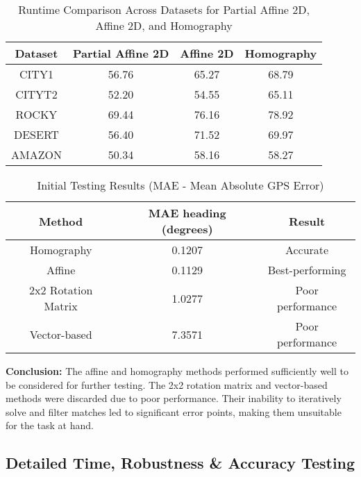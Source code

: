     
    \begin{table}[H]
        \centering
        \caption{Runtime Comparison Across Datasets for Partial Affine 2D, Affine 2D, and Homography}
        \label{tab:runtime_comparison}
        \begin{tabular}{|c|c|c|c|}
        \hline
        \textbf{Dataset} & \textbf{Partial Affine 2D} & \textbf{Affine 2D} & \textbf{Homography} \\
        \hline
        CITY1   & 56.76 & 65.27 & 68.79 \\
        CITYT2  & 52.20 & 54.55 & 65.11 \\
        ROCKY   & 69.44 & 76.16 & 78.92 \\
        DESERT  & 56.40 & 71.52 & 69.97 \\
        AMAZON  & 50.34 & 58.16 & 58.27 \\
        \hline
        \end{tabular}
        \end{table}
        






\begin{table}[H]
    \centering
    \begin{tabular}{|c|c|c|}
        \hline
        \textbf{Method} & \textbf{MAE heading (degrees)} & \textbf{Result} \\
        \hline
        Homography & 0.1207 & Accurate \\  
        Affine & 0.1129 & Best-performing \\  
        2x2 Rotation Matrix & 1.0277 & Poor performance \\  
        Vector-based & 7.3571 & Poor performance \\  
        \hline
    \end{tabular}
    \caption{Initial Testing Results (MAE - Mean Absolute GPS Error)}
    \label{tab:initial_rotation_testing}
\end{table}

\textbf{Conclusion:} The affine and homography methods performed sufficiently well to be considered for further testing. The 2x2 rotation matrix and vector-based methods were discarded due to poor performance. Their inability to iteratively solve and filter matches led to significant error points, making them unsuitable for the task at hand.


\subsection{Detailed Time, Robustness \& Accuracy Testing}


